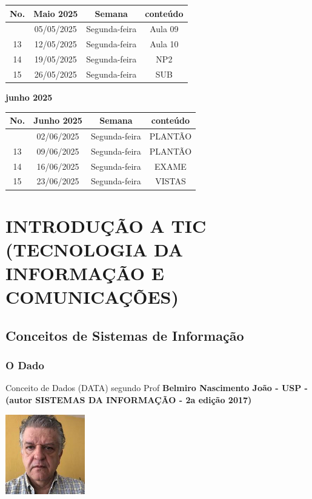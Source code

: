 \documentclass[
]{book}
\begin{document}
\begin{longtable}[]{@{}cccc@{}}
\toprule\noalign{}
No. & Maio 2025 & Semana & conteúdo \\
\midrule\noalign{}
\endhead
\bottomrule\noalign{}
\endlastfoot
12 & 05/05/2025 & Segunda-feira & Aula 09 \\
13 & 12/05/2025 & Segunda-feira & Aula 10 \\
14 & 19/05/2025 & Segunda-feira & NP2 \\
15 & 26/05/2025 & Segunda-feira & SUB \\
\end{longtable}

\textbf{junho 2025}

\begin{longtable}[]{@{}cccc@{}}
\toprule\noalign{}
No. & Junho 2025 & Semana & conteúdo \\
\midrule\noalign{}
\endhead
\bottomrule\noalign{}
\endlastfoot
12 & 02/06/2025 & Segunda-feira & PLANTÃO \\
13 & 09/06/2025 & Segunda-feira & PLANTÃO \\
14 & 16/06/2025 & Segunda-feira & EXAME \\
15 & 23/06/2025 & Segunda-feira & VISTAS \\
\end{longtable}

\chapter{INTRODUÇÃO A TIC (TECNOLOGIA DA INFORMAÇÃO E COMUNICAÇÕES)}\label{introduuxe7uxe3o-a-tic-tecnologia-da-informauxe7uxe3o-e-comunicauxe7uxf5es}

\section{Conceitos de Sistemas de Informação}\label{conceitos-de-sistemas-de-informauxe7uxe3o}

\subsection{O Dado}\label{o-dado}

Conceito de Dados (DATA) segundo Prof \textbf{Belmiro Nascimento João - USP - (autor SISTEMAS DA INFORMAÇÃO - 2a edição 2017)}

\includegraphics[width=1.36458in,height=\textheight]{images/belmiro_do_nascimento_joao-2.jpg}
\end{document}

